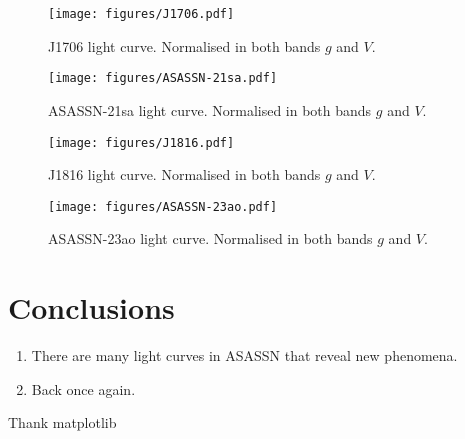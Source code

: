 \documentclass{aa}
\begin{document}
\begin{figure*}
   \begin{centering}
   \texttt{[image: figures/J1706.pdf]}
      \caption{J1706 light curve. Normalised in both bands $g$ and $V$.
              }
              \label{fig:J1706}
              \end{centering}
       \end{figure*}


\begin{figure*}
   \begin{centering}
   \texttt{[image: figures/ASASSN-21sa.pdf]}
      \caption{ASASSN-21sa light curve. Normalised in both bands $g$ and $V$.
              }
              \label{fig:asassn21sa}
              \end{centering}
       \end{figure*}


\begin{figure*}
   \begin{centering}
   \texttt{[image: figures/J1816.pdf]}
      \caption{J1816 light curve. Normalised in both bands $g$ and $V$.
              }
              \label{fig:J1816}
              \end{centering}
       \end{figure*}

       
\begin{figure*}
   \begin{centering}
   \texttt{[image: figures/ASASSN-23ao.pdf]}
      \caption{ASASSN-23ao light curve. Normalised in both bands $g$ and $V$.
              }
              \label{fig:ASASSN-23ao}
              \end{centering}
       \end{figure*}
\section{Conclusions}\label{sec:conclusion}

   \begin{enumerate}
      \item There are many light curves in ASASSN that reveal new phenomena.
      \item Back once again.
   \end{enumerate}

\begin{acknowledgements}
Thank matplotlib

\end{acknowledgements}



\end{document}
